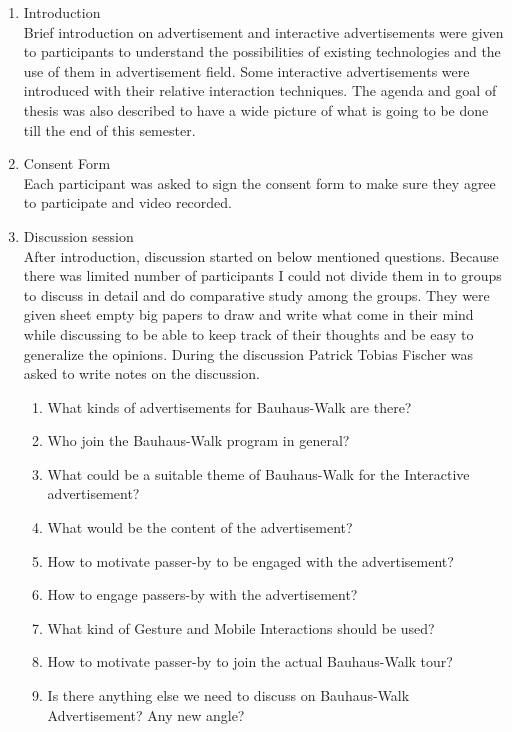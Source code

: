 \begin{enumerate}
\item Introduction \\
Brief introduction on advertisement and interactive advertisements were given to participants to understand the possibilities of existing technologies and the use of them in advertisement field. Some interactive advertisements were introduced with their relative interaction techniques. The agenda and goal of thesis was also described to have a wide picture of what is going to be done till the end of this semester.

\item Consent Form \\
Each participant was asked to sign the consent form to make sure they agree to participate and video recorded.

\item Discussion session \\
After introduction, discussion started on below mentioned questions. Because there was limited number of participants I could not divide them in to groups to discuss in detail and do comparative study among the groups. They were given sheet empty big papers to draw and write what come in their mind while discussing to be able to keep track of their thoughts and be easy to generalize the opinions. During the discussion Patrick Tobias Fischer was asked to write notes on the discussion.

\begin{enumerate}
\item   What kinds of advertisements for Bauhaus-Walk are there?
\item   Who join the Bauhaus-Walk program in general?
\item   What could be a suitable theme of Bauhaus-Walk for the Interactive advertisement?
\item   What would be the content of the advertisement?
\item   How to motivate passer-by to be engaged with the advertisement?
\item   How to engage passers-by with the advertisement?
\item   What kind of Gesture and Mobile Interactions should be used?
\item   How to motivate passer-by to join the actual Bauhaus-Walk tour?
\item   Is there anything else we need to discuss on Bauhaus-Walk Advertisement? Any new angle?

\end{enumerate}


\end{enumerate}


